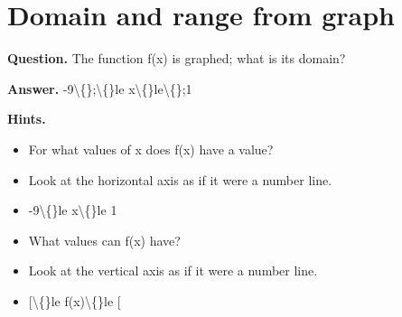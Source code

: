 \documentclass{article}
\begin{document}
\section*{Domain and range from graph}
\textbf{Question.} The function f(x) is graphed; what is its domain?

\textbf{Answer.} -9\textbackslash\{\};\textbackslash\{\}le x\textbackslash\{\}le\textbackslash\{\};1

\textbf{Hints.}
\begin{itemize}
  \item For what values of x does f(x) have a value?
  \item Look at the horizontal axis as if it were a number line.
  \item -9\textbackslash\{\}le x\textbackslash\{\}le 1
  \item What values can f(x) have?
  \item Look at the vertical axis as if it were a number line.
  \item [\textbackslash\{\}le f(x)\textbackslash\{\}le [
\end{itemize}
\end{document}
